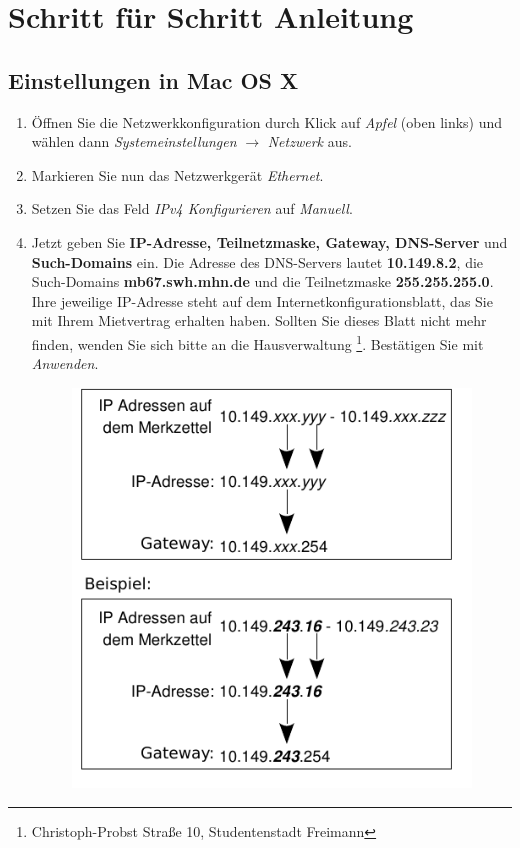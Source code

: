 \documentclass[a4paper,12pt]{scrartcl}
\begin{document}
\section*{Schritt für Schritt Anleitung}
\subsection*{Einstellungen in Mac OS X}
\begin{enumerate}
    \item Öffnen Sie die Netzwerkkonfiguration durch Klick auf \emph{Apfel} (oben links) und wählen dann \emph{Systemeinstellungen} $\rightarrow$ \emph{Netzwerk} aus.
    \item Markieren Sie nun das Netzwerkgerät \emph{Ethernet}.
    \item Setzen Sie das Feld \emph{IPv4 Konfigurieren} auf \emph{Manuell}.
    \item Jetzt geben Sie \textbf{IP-Adresse, Teilnetzmaske, Gateway, DNS-Server} und \textbf{Such-Domains} ein. Die Adresse des DNS-Servers lautet \textbf{10.149.8.2}, die Such-Domains \textbf{mb67.swh.mhn.de} und die Teilnetzmaske \textbf{255.255.255.0}. Ihre jeweilige IP-Adresse steht auf dem Internetkonfigurationsblatt, das Sie mit Ihrem Mietvertrag erhalten haben. Sollten Sie dieses Blatt nicht mehr finden, wenden Sie sich bitte an die Hausverwaltung \footnote{Christoph-Probst Straße 10, Studentenstadt Freimann}. Bestätigen Sie mit \emph{Anwenden}.
      \begin{figure}[h!]
      \centering
        \begin{minipage}[c]{0.38\linewidth}
          \centering
          \includegraphics[width=\linewidth,keepaspectratio]{Bilder/IP_Gerneric}

\end{minipage}
\end{figure}
\end{enumerate}
\end{document}
